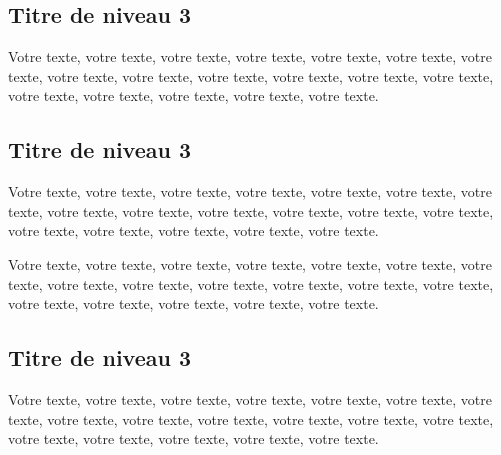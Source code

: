 \subsection{Titre de niveau 3}

Votre texte, votre texte, votre texte, votre texte, votre texte, votre texte, votre texte, votre texte, votre texte, votre texte, votre texte, votre texte, votre texte, votre texte, votre texte, votre texte, votre texte, votre texte.


\subsection{Titre de niveau 3}

Votre texte, votre texte, votre texte, votre texte, votre texte, votre texte, votre texte, votre texte, votre texte, votre texte, votre texte, votre texte, votre texte, votre texte, votre texte, votre texte, votre texte, votre texte.

\begin{table}[tbph!]
\end{table}

Votre texte, votre texte, votre texte, votre texte, votre texte, votre texte, votre texte, votre texte, votre texte, votre texte, votre texte, votre texte, votre texte, votre texte, votre texte, votre texte, votre texte, votre texte.


\subsection{Titre de niveau 3}

Votre texte, votre texte, votre texte, votre texte, votre texte, votre texte, votre texte, votre texte, votre texte, votre texte, votre texte, votre texte, votre texte, votre texte, votre texte, votre texte, votre texte, votre texte.

